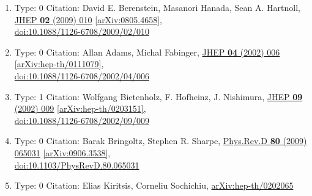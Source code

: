 \documentclass[a4paper,10pt]{article}
\begin{document}
\begin{enumerate}
\begin{enumerate}
  \item Type: 0 Citation: David E. Berenstein, Masanori Hanada, Sean A. Hartnoll, \href{https://www.doi.org/10.1088/1126-6708/2009/02/010}{JHEP {\bf 02} (2009) 010}  \href{https://arxiv.org/abs/0805.4658}{[arXiv:0805.4658]},\\\href{https://www.doi.org/10.1088/1126-6708/2009/02/010}{doi:10.1088/1126-6708/2009/02/010}
  \item Type: 0 Citation: Allan Adams, Michal Fabinger, \href{https://www.doi.org/10.1088/1126-6708/2002/04/006}{JHEP {\bf 04} (2002) 006}  \href{https://arxiv.org/abs/hep-th/0111079}{[arXiv:hep-th/0111079]},\\\href{https://www.doi.org/10.1088/1126-6708/2002/04/006}{doi:10.1088/1126-6708/2002/04/006}
  \item Type: 1 Citation: Wolfgang Bietenholz, F. Hofheinz, J. Nishimura, \href{https://www.doi.org/10.1088/1126-6708/2002/09/009}{JHEP {\bf 09} (2002) 009}  \href{https://arxiv.org/abs/hep-th/0203151}{[arXiv:hep-th/0203151]},\\\href{https://www.doi.org/10.1088/1126-6708/2002/09/009}{doi:10.1088/1126-6708/2002/09/009}
  \item Type: 0 Citation: Barak Bringoltz, Stephen R. Sharpe, \href{https://www.doi.org/10.1103/PhysRevD.80.065031}{Phys.Rev.D {\bf 80} (2009) 065031}  \href{https://arxiv.org/abs/0906.3538}{[arXiv:0906.3538]},\\\href{https://www.doi.org/10.1103/PhysRevD.80.065031}{doi:10.1103/PhysRevD.80.065031}
  \item Type: 0 Citation: Elias Kiritsis, Corneliu Sochichiu, \href{https://arxiv.org/abs/hep-th/0202065}{arXiv:hep-th/0202065}

\end{enumerate}
\end{enumerate}
\end{document}
